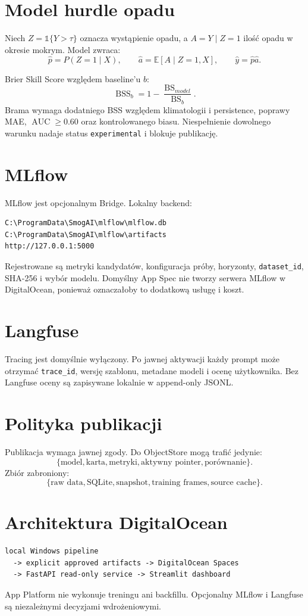 \documentclass[11pt,a4paper]{article}
\begin{document}
\section{Model hurdle opadu}

Niech $Z=\mathbb{1}\{Y>\tau\}$ oznacza wystąpienie opadu, a $A=Y\mid Z=1$
ilość opadu w okresie mokrym. Model zwraca:
\[
 \widehat p=P(Z=1\mid X),\qquad
 \widehat a=\mathbb{E}[A\mid Z=1,X],\qquad
 \widehat y=\widehat p\widehat a.
\]

Brier Skill Score względem baseline'u $b$:
\[
 \operatorname{BSS}_b=1-\frac{\operatorname{BS}_{model}}
 {\operatorname{BS}_b}.
\]
Brama wymaga dodatniego BSS względem klimatologii i persistence, poprawy MAE,
$\operatorname{AUC}\ge0.60$ oraz kontrolowanego biasu. Niespełnienie dowolnego
warunku nadaje status \texttt{experimental} i blokuje publikację.

\section{MLflow}

MLflow jest opcjonalnym Bridge. Lokalny backend:
\begin{lstlisting}
C:\ProgramData\SmogAI\mlflow\mlflow.db
C:\ProgramData\SmogAI\mlflow\artifacts
http://127.0.0.1:5000
\end{lstlisting}
Rejestrowane są metryki kandydatów, konfiguracja próby, horyzonty,
\texttt{dataset\_id}, SHA-256 i wybór modelu. Domyślny App Spec nie tworzy
serwera MLflow w DigitalOcean, ponieważ oznaczałoby to dodatkową usługę i koszt.

\section{Langfuse}

Tracing jest domyślnie wyłączony. Po jawnej aktywacji każdy prompt może otrzymać
\texttt{trace\_id}, wersję szablonu, metadane modeli i ocenę użytkownika. Bez
Langfuse oceny są zapisywane lokalnie w append-only JSONL.

\section{Polityka publikacji}

Publikacja wymaga jawnej zgody. Do ObjectStore mogą trafić jedynie:
\[
\{\text{model},\text{karta},\text{metryki},\text{aktywny pointer},
\text{porównanie}\}.
\]
Zbiór zabroniony:
\[
\{\text{raw data},\text{SQLite},\text{snapshot},\text{training frames},
\text{source cache}\}.
\]

\section{Architektura DigitalOcean}

\begin{lstlisting}
local Windows pipeline
  -> explicit approved artifacts -> DigitalOcean Spaces
  -> FastAPI read-only service -> Streamlit dashboard
\end{lstlisting}
App Platform nie wykonuje treningu ani backfillu. Opcjonalny MLflow i Langfuse
są niezależnymi decyzjami wdrożeniowymi.
\end{document}
